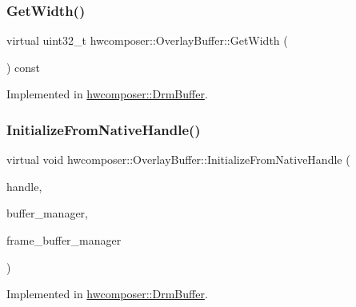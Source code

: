 \subsubsection{\texorpdfstring{Get\+Width()}{GetWidth()}}
{\footnotesize\ttfamily virtual uint32\+\_\+t hwcomposer\+::\+Overlay\+Buffer\+::\+Get\+Width (\begin{DoxyParamCaption}{ }\end{DoxyParamCaption}) const\hspace{0.3cm}{\ttfamily [pure virtual]}}



Implemented in \mbox{\hyperlink{classhwcomposer_1_1DrmBuffer_ac4af6516c644cfb6bbf34083bbdc94ae}{hwcomposer\+::\+Drm\+Buffer}}.

\mbox{\label{classhwcomposer_1_1OverlayBuffer_afcb712b3cc25aa9d5d4ee719ea660451}} 
\subsubsection{\texorpdfstring{Initialize\+From\+Native\+Handle()}{InitializeFromNativeHandle()}}
{\footnotesize\ttfamily virtual void hwcomposer\+::\+Overlay\+Buffer\+::\+Initialize\+From\+Native\+Handle (\begin{DoxyParamCaption}\item[{\mbox{\hyperlink{alios_2platformdefines_8h_ac0a2eaf260f556d17fe489911f017bdf}{H\+W\+C\+Native\+Handle}}}]{handle,  }\item[{\mbox{\hyperlink{classhwcomposer_1_1ResourceManager}{Resource\+Manager}} $\ast$}]{buffer\+\_\+manager,  }\item[{\mbox{\hyperlink{classhwcomposer_1_1FrameBufferManager}{Frame\+Buffer\+Manager}} $\ast$}]{frame\+\_\+buffer\+\_\+manager }\end{DoxyParamCaption})\hspace{0.3cm}{\ttfamily [pure virtual]}}



Implemented in \mbox{\hyperlink{classhwcomposer_1_1DrmBuffer_afced6df8661c057ca6b7195d16c49a80}{hwcomposer\+::\+Drm\+Buffer}}.

\mbox{\label{classhwcomposer_1_1OverlayBuffer_a9c26bc9aa05fa166b672813b979efa79}} 
